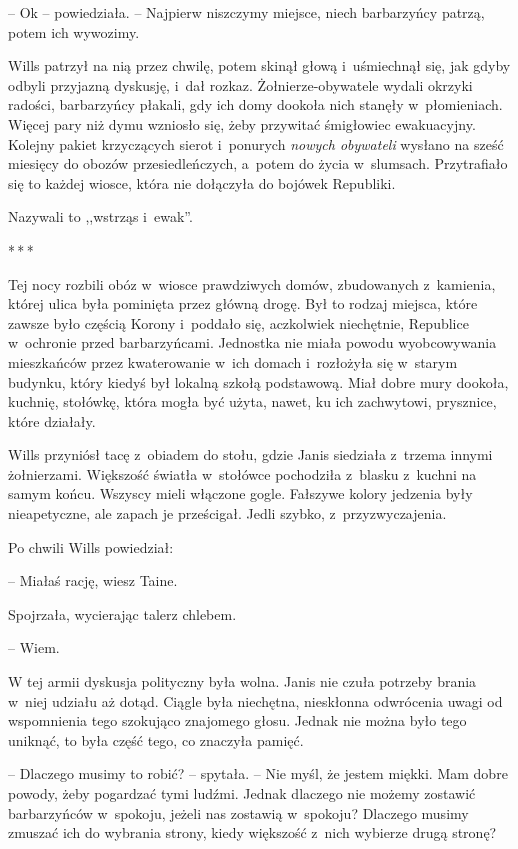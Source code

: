 \documentclass[oneside,polish,11pt,sfheadings]{mwbk}
\newcommand{\threeast}{\bigskip\par\centerline{*\,*\,*}\medskip\par}%
\begin{document}
-- Ok -- powiedziała. -- Najpierw niszczymy miejsce, niech barbarzyńcy
patrzą, potem ich wywozimy.

Wills patrzył na nią przez chwilę, potem skinął głową i~uśmiechnął się,
jak gdyby odbyli przyjazną dyskusję, i~dał rozkaz. Żołnierze-obywatele
wydali okrzyki radości, barbarzyńcy płakali, gdy ich domy dookoła nich
stanęły w~płomieniach. Więcej pary niż dymu wzniosło się, żeby przywitać
śmigłowiec ewakuacyjny. Kolejny pakiet krzyczących sierot i~ponurych
\emph{nowych obywateli} wysłano na sześć miesięcy do obozów
przesiedleńczych, a~potem do życia w~slumsach. Przytrafiało się to
każdej wiosce, która nie dołączyła do bojówek Republiki.

Nazywali to ,,wstrząs i~ewak''.
  \threeast 

Tej nocy rozbili obóz w~wiosce prawdziwych domów, zbudowanych z~kamienia, której ulica była pominięta przez główną drogę. Był to rodzaj
miejsca, które zawsze było częścią Korony i~poddało się, aczkolwiek
niechętnie, Republice w~ochronie przed barbarzyńcami. Jednostka nie
miała powodu wyobcowywania mieszkańców przez kwaterowanie w~ich domach i~rozłożyła się w~starym budynku, który kiedyś był lokalną szkołą
podstawową. Miał dobre mury dookoła, kuchnię, stołówkę, która mogła być
użyta, nawet, ku ich zachwytowi, prysznice, które działały.

Wills przyniósł tacę z~obiadem do stołu, gdzie Janis siedziała z~trzema
innymi żołnierzami. Większość światła w~stołówce pochodziła z~blasku z~kuchni na samym końcu. Wszyscy mieli włączone gogle. Fałszywe kolory
jedzenia były nieapetyczne, ale zapach je prześcigał. Jedli szybko, z~przyzwyczajenia.

Po chwili Wills powiedział: 

-- Miałaś rację, wiesz Taine.

Spojrzała, wycierając talerz chlebem. 

-- Wiem.

W tej armii dyskusja polityczny była wolna. Janis nie czuła potrzeby
brania w~niej udziału aż dotąd. Ciągle była niechętna, nieskłonna
odwrócenia uwagi od wspomnienia tego szokująco znajomego głosu. Jednak
nie można było tego uniknąć, to była część tego, co znaczyła pamięć.

-- Dlaczego musimy to robić? -- spytała. -- Nie myśl, że jestem miękki. Mam
dobre powody, żeby pogardzać tymi ludźmi. Jednak dlaczego nie możemy
zostawić barbarzyńców w~spokoju, jeżeli nas zostawią w~spokoju? Dlaczego
musimy zmuszać ich do wybrania strony, kiedy większość z~nich wybierze
drugą stronę?
\end{document}
